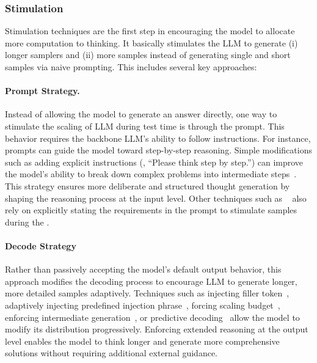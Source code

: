 
\subsubsection{Stimulation}
\label{subsec:stimulation}

Stimulation techniques are the first step in encouraging the model to allocate more computation to thinking. It basically stimulates the LLM to generate (i) longer samplers and (ii) more samples instead of generating single and short samples via naive prompting. This includes several key approaches:


\paragraph{Prompt Strategy.} Instead of allowing the model to generate an answer directly, one way to stimulate the scaling of LLM during test time is through the prompt. This behavior requires the backbone LLM's ability to follow instructions. For instance, prompts can guide the model toward step-by-step reasoning. Simple modifications such as adding explicit instructions (\eg, ``Please think step by step.'') can improve the model’s ability to break down complex problems into intermediate steps~\citep{lightman2023let}. This strategy ensures more deliberate and structured thought generation by shaping the reasoning process at the input level. Other techniques such as ~\cite{wei2022chain, ranaldi2025improvingchainofthoughtreasoningquasisymbolic} also rely on explicitly stating the requirements in the prompt to stimulate samples during the \TTS.

\paragraph{Decode Strategy} Rather than passively accepting the model’s default output behavior, this approach modifies the decoding process to encourage LLM to generate longer, more detailed samples adaptively. Techniques such as 
injecting filler token~\citep{pfau2024lets}, adaptively injecting predefined injection phrase~\citep{jin2020diseasedoespatienthave}, forcing scaling budget~\citep{muennighoff2025s1}, enforcing intermediate generation~\citep{li2025draftsanswersunlockingllm}, or predictive decoding~\citep{ma2025nonmyopic} allow the model to modify its distribution progressively. Enforcing extended reasoning at the output level enables the model to think longer and generate more comprehensive solutions without requiring additional external guidance.

